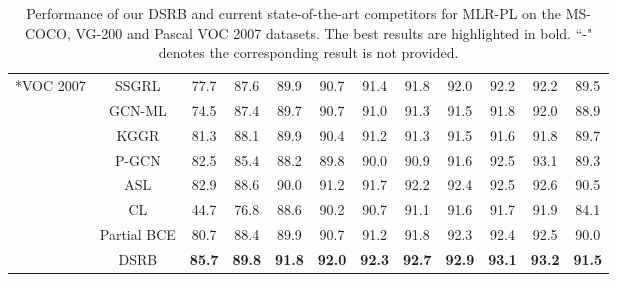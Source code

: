\documentclass[lettersize,journal]{IEEEtran}
\begin{document}
\begin{table*}
\begin{tabular}{c|c|ccccccccc|c}
  \hline
  \hline
  \centering \multirow{8}*{VOC 2007} & SSGRL & 77.7 & 87.6 & 89.9 & 90.7 & 91.4 & 91.8 & 92.0 & 92.2 & 92.2 & 89.5 \\
  \centering ~ & GCN-ML & 74.5 & 87.4 & 89.7 & 90.7 & 91.0 & 91.3 & 91.5 & 91.8 & 92.0 & 88.9 \\
  \centering ~ & KGGR & 81.3 & 88.1 & 89.9 & 90.4 & 91.2 & 91.3 & 91.5 & 91.6 & 91.8 & 89.7 \\
  \centering ~ & P-GCN & 82.5 & 85.4 & 88.2 & 89.8 & 90.0 & 90.9 & 91.6 & 92.5 & 93.1 & 89.3 \\
  \centering ~ & ASL & 82.9 & 88.6 & 90.0 & 91.2 & 91.7 & 92.2 & 92.4 & 92.5 & 92.6 & 90.5 \\
  \centering ~ & CL & 44.7 & 76.8 & 88.6 & 90.2 & 90.7 & 91.1 & 91.6 & 91.7 & 91.9 & 84.1 \\
  \centering ~ & Partial BCE & 80.7 & 88.4 & 89.9 & 90.7 & 91.2 & 91.8 & 92.3 & 92.4 & 92.5 & 90.0 \\
  \centering ~ & DSRB & \textbf{85.7} & \textbf{89.8} & \textbf{91.8} & \textbf{92.0} & \textbf{92.3} & \textbf{92.7} & \textbf{92.9} & \textbf{93.1} & \textbf{93.2} & \textbf{91.5} \\
  \hline
  \end{tabular}
  \vspace{10pt}
  \caption{Performance of our DSRB and current state-of-the-art competitors for MLR-PL on the MS-COCO, VG-200 and Pascal VOC 2007 datasets. The best results are highlighted in bold. ``-" denotes the corresponding result is not provided.}
  \label{tab:mAP-results}
\end{table*}
\end{document}
